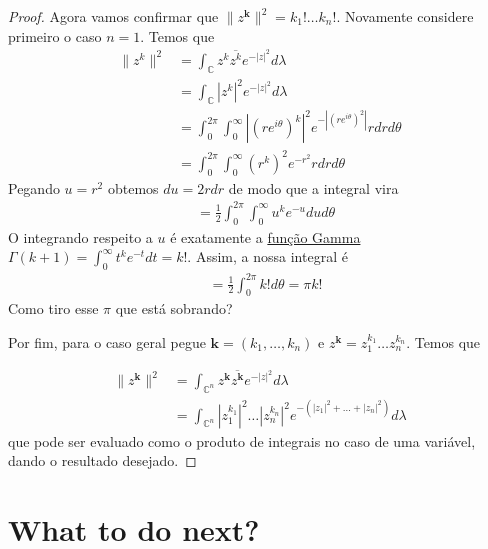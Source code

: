 \begin{proof}
Agora vamos confirmar que $\|z^\mathbf{k}\|^2=k_1!\ldots k_n!$. Novamente considere primeiro o caso $n=1$. Temos que
 \begin{align*}
	\|z^k\|^2&=\int_{\mathbb{C}}z^k\overline{z^k}e^{-|z|^2}d\lambda\\
	&=\int_{\mathbb{C}}|z^k|^2e^{-|z|^2}d \lambda\\
	&=\int_{0}^{2\pi}\int_{0}^\infty|(re^{i\theta})^k|^2e^{-|(re^{i\theta})^2|}rdrd\theta\\
	&=\int_{0}^{2\pi}\int_{0}^\infty(r^k)^2e^{-r^2}rdrd\theta
\end{align*}
Pegando $u=r^2$ obtemos $du=2rdr$ de modo que a integral vira
 \begin{align*}
	&=\frac{1}{2}\int_{0}^{2\pi}\int_{0}^\infty u^{k}e^{-u}du d\theta
\end{align*}
O integrando respeito a $u$ é exatamente a \href{https://en.wikipedia.org/wiki/Gamma_function}{função Gamma} $\Gamma(k+1)=\int_{0}^\infty t^{k}e^{-t}dt=k!$. Assim, a nossa integral é
\begin{align*}
	&=\frac{1}{2}\int_{0}^{2\pi}k!d\theta=\pi k!
\end{align*}
{\color{2}Como tiro esse $\pi$ que está sobrando?}

Por fim, para o caso geral pegue $\mathbf{k}=(k_1,\ldots,k_n)$ e $z^\mathbf{k}=z_1^{k_1}\ldots z_n^{k_n}$. Temos que

\begin{align*}
	\|z^\mathbf{k}\|^2&=\int_{\mathbb{C}^n}z^\mathbf{k}\overline{z^{\mathbf{k}}}e^{-|z|^2}d \lambda\\
	&=\int_{\mathbb{C}^{n}}|z_1^{k_1}|^2\ldots |z_n^{k_n}|^2e^{-(|z_1|^2+\ldots +|z_n|^2)}d \lambda
\end{align*}
que pode ser evaluado como o produto de integrais no caso de uma variável, dando o resultado desejado.


\end{proof}


\iffalse
\begin{align*}\left<f,\varphi_a\right> &=\int_{\mathbb{C}^n}f(z)\overline{\varphi_a(z)}e^{-|z|^2}d\lambda(z)\\
		&=\int_{\mathbb{C}^{n}}f(z)\overline{\operatorname{exp}(z_1\overline{a}_1+\ldots +z_n\overline{a}_n)}e^{-|z|^2}d \lambda(z)
\end{align*}
\fi

\section{What to do next?}

